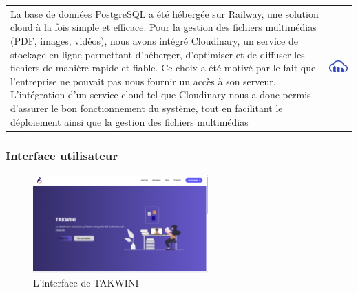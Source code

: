 \documentclass{article}
\begin{document}
\vspace{0,3cm}
\noindent
\begin{tabular}
{@{}m{}@{\hspace{1em}}m{}@{}}
 La base de données PostgreSQL a été hébergée sur Railway, une solution cloud à la fois simple et efficace. Pour la gestion des fichiers multimédias (PDF, images, vidéos), nous avons intégré Cloudinary, un service de stockage en ligne permettant d’héberger, d’optimiser et de diffuser les fichiers de manière rapide et fiable.
Ce choix a été motivé par le fait que l’entreprise ne pouvait pas nous fournir un accès à son serveur. L’intégration d’un service cloud tel que Cloudinary nous a donc permis d’assurer le bon fonctionnement du système, tout en facilitant le déploiement ainsi que la gestion des fichiers multimédias
 
&
\includegraphics[width=\linewidth]{cloud.png} %
\end{tabular}




\subsubsection{Interface utilisateur}



\begin{figure}[H]
  \centering
  \includegraphics[width=0.6\textwidth]{inter.png}
  \caption{L'interface de TAKWINI}
  \label{fig:home}
\end{figure}
\end{document}
